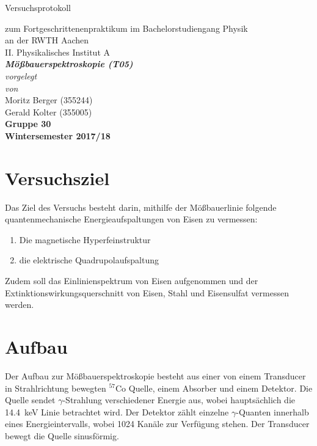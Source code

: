 \documentclass[12pt,a4paper]{article}
\author{Gerald}
\begin{document}
	\setlength{\parindent}{0pt} 
	\begin{center}
		{\LARGE Versuchsprotokoll}\\
		\begin{large}
			zum Fortgeschrittenenpraktikum im Bachelorstudiengang Physik\\[0.4cm]
			an der RWTH Aachen\\
			II. Physikalisches Institut A\\[5.5cm]
			\Large\textbf{\textsl{Mößbauerspektroskopie (T05)}}\\[5.5cm]
			\normalsize\textit{vorgelegt\\von}\\[0.4cm]
			\large{Moritz Berger (355244)\\Gerald Kolter (355005)}\\\textbf{Gruppe 30}\\[2cm]
			\large \textbf{Wintersemester 2017/18}
		\end{large}
	\end{center}
	\newpage
	
	\tableofcontents
	\newpage

\section{Versuchsziel}
Das Ziel des Versuchs besteht darin, mithilfe der Mößbauerlinie folgende quantenmechanische Energieaufspaltungen von Eisen zu vermessen:
\begin{enumerate}
\item Die magnetische Hyperfeinstruktur
\item die elektrische Quadrupolaufspaltung
\end{enumerate}
Zudem soll das Einlinienspektrum von Eisen aufgenommen und der Extinktionswirkungsquerschnitt von Eisen, Stahl und Eisensulfat vermessen werden.

\section{Aufbau}
Der Aufbau zur Mößbauerspektroskopie besteht aus einer von einem Transducer in Strahlrichtung bewegten $^{57}$Co Quelle, einem Absorber und einem Detektor. Die Quelle sendet $\gamma$-Strahlung verschiedener Energie aus, wobei hauptsächlich die \SI{14,4}{keV} Linie betrachtet wird. Der Detektor zählt einzelne $\gamma$-Quanten innerhalb eines Energieintervalls, wobei 1024 Kanäle zur Verfügung stehen. Der Transducer bewegt die Quelle sinusförmig.
\end{document}
